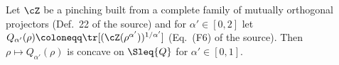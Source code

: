 
\begin{fact}\label{fact:concavity}
Let $\cZ$ be a pinching built from a complete family of mutually orthogonal
projectors (Def.~22 of the source) and for $\alpha'\in[0,2]$ let
$Q_{\alpha'}(\rho)\coloneqq
\tr[(\cZ(\rho^{\alpha'}))^{1/\alpha'}]$ (Eq.~(F6) of the source). Then
$\rho\mapsto Q_{\alpha'}(\rho)$ is concave on $\Sleq{Q}$ for
$\alpha'\in[0,1]$.
\end{fact}
